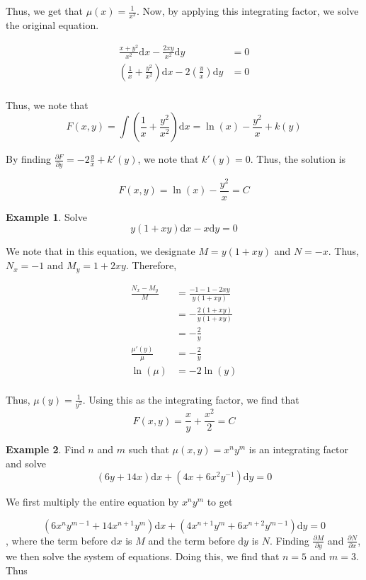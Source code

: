 \documentclass[11pt]{article}
\theoremstyle{plain} %
\theoremstyle{definition}
\theoremstyle{example}
\newtheorem*{example}{Example}
\theoremstyle{remark}
\begin{document}
	Thus, we get that $\mu(x) = \frac{1}{x^2}$. Now, by applying this integrating factor, we solve the original equation.
	
\begin{align*}
	\frac{x+y^2}{x^2}\mathrm d x - \frac{2xy}{x^2}\mathrm d y &= 0 \\
	\left(\frac{1}{x} + \frac{y^2}{x^2}\right) \mathrm d x - 2\left(\frac{y}{x}\right) \mathrm d y &= 0\\
\end{align*}

Thus, we note that 
$$F(x,y) = \int \left(\frac{1}{x} + \frac{y^2}{x^2}\right) \mathrm d x = \ln(x) -\frac{y^2}{x} + k(y)$$

By finding $\frac{\partial F}{\partial y} = -2\frac{y}{x}+k'(y)$, we note that $k'(y) =0$. Thus, the solution is 

$$F(x,y) = \ln(x) -\frac{y^2}{x} = C$$

\begin{example}
Solve $$y(1+xy)\mathrm d x - x \mathrm d y = 0$$
\end{example}

We note that in this equation, we designate $M = y(1+xy)$ and $N = -x$. Thus, $N_x = -1$ and $M_y = 1+2xy$. Therefore, 

\begin{align*}
\frac{N_x-M_y}{M} &= \frac{-1-1-2xy}{y(1+xy)} \\
&= -\frac{2(1+xy)}{y(1+xy)} \\
&= -\frac{2}{y}\\
\frac{\mu '(y)}{\mu} &= -\frac{2}{y}\\
\ln(\mu) &= -2\ln(y)\\
\end{align*}

Thus, $\mu(y) = \frac{1}{y^2}$. Using this as the integrating factor, we find that $$F(x,y) = \frac{x}{y} + \frac{x^2}{2} = C$$

\begin{example}
Find $n$ and $m$ such that $\mu(x,y) = x^ny^m$ is an integrating factor and solve $$(6y+14x)\mathrm d x + \left(4x+6x^2y^{-1}\right)\mathrm d y = 0$$
\end{example}

We first multiply the entire equation by $x^ny^m$ to get 


$$\left(6x^ny^{m-1} + 14x^{n+1}y^m\right)\mathrm d x + \left(4x^{n+1}y^m + 6x^{n+2}y^{m-1}\right)\mathrm d y = 0$$, where the term before $\mathrm d x$ is $M$ and the term before $\mathrm d y$ is $N$. Finding $\frac{\partial M}{\partial y}$ and $\frac{\partial N}{\partial x}$, we then solve the system of equations. Doing this, we find that $n=5$ and $m=3$. Thus
\end{document}
